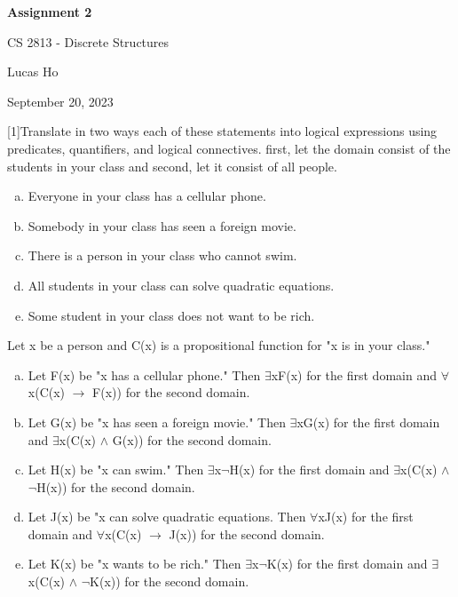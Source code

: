\documentclass{article} %
\newcommand{\question}[2][]{\begin{flushleft}
        \textbf{Question #1}: \textit{#2}

\end{flushleft}}
\newcommand{\maketitletwo}[2][]{\begin{center}
        \Large{\textbf{Assignment 2}
            
            CS 2813 - Discrete Structures} %
        \vspace{5pt}
        
        \normalsize{Lucas Ho  %
        
        September 20, 2023}        %
        \vspace{15pt}
        
\end{center}}
\begin{document}
\maketitletwo[5]  %
    
    \question[1]{Translate in two ways each of these statements into logical expressions using predicates, quantifiers, and logical connectives. first, let the domain consist of the students in your class and second, let it consist of all people.} 
    \begin{enumerate}[a)]
    \item {Everyone in your class has a cellular phone.}
    \item {Somebody in your class has seen a foreign movie.}
    \item {There is a person in your class who cannot swim.}
    \item {All students in your class can solve quadratic equations.}
    \item {Some student in your class does not want to be rich.}
    \end{enumerate}
    Let x be a person and C(x) is a propositional function for "x is in your class."
    \begin{enumerate}[a)]
      \item {Let F(x) be "x has a cellular phone." Then $\exists$xF(x) for the first domain and $\forall$x(C(x) $\rightarrow$ F(x)) for the second domain.}
      \item {Let G(x) be "x has seen a foreign movie." Then $\exists$xG(x) for the first domain and $\exists$x(C(x) $\land$ G(x)) for the second domain.}
      \item {Let H(x) be "x can swim." Then $\exists$x$\neg$H(x) for the first domain and $\exists$x(C(x) $\land$ $\neg$H(x)) for the second domain.}
      \item {Let J(x) be "x can solve quadratic equations. Then $\forall$xJ(x) for the first domain and $\forall$x(C(x) $\rightarrow$ J(x)) for the second domain.}
      \item {Let K(x) be "x wants to be rich." Then $\exists$x$\neg$K(x) for the first domain and $\exists$x(C(x) $\land$ $\neg$K(x)) for the second domain.}
    \end{enumerate}
\end{document}
